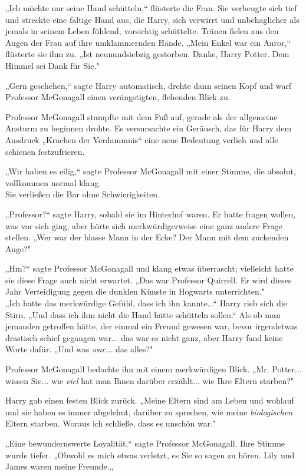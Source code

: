 {„Ich möchte nur seine Hand schütteln,“ flüsterte die Frau. Sie verbeugte sich tief und streckte eine faltige Hand aus, die Harry, sich verwirrt und unbehaglicher als jemals in seinem Leben fühlend, vorsichtig schüttelte. Tränen fielen aus den Augen der Frau auf ihre umklammernden Hände. „Mein Enkel war ein Auror,“ flüsterte sie ihm zu. „Ist neunundsiebzig gestorben. Danke, Harry Potter. Dem Himmel sei Dank für Sie."

„Gern geschehen,“ sagte Harry automatisch, drehte dann seinen Kopf und warf Professor McGonagall einen verängstigten, flehenden Blick zu.

Professor McGonagall stampfte mit dem Fuß auf, gerade als der allgemeine Ansturm zu beginnen drohte. Es versursachte ein Geräusch, das für Harry dem Ausdruck „Krachen der Verdammnis“ eine neue Bedeutung verlieh und alle schienen festzufrieren.

„Wir haben es eilig,“ sagte Professor McGonagall mit einer Stimme, die absolut, vollkommen normal klang.\\ Sie verließen die Bar ohne Schwierigkeiten.

„Professor?“ sagte Harry, sobald sie im Hinterhof waren. Er hatte fragen wollen, was vor sich ging, aber hörte sich merkwürdigerweise eine ganz andere Frage stellen. „Wer war der blasse Mann in der Ecke? Der Mann mit dem zuckenden Auge?"

„Hm?“ sagte Professor McGonagall und klang etwas überrascht; vielleicht hatte sie diese Frage auch nicht erwartet. „Das war Professor Quirrell. Er wird dieses Jahr Verteidigung gegen die dunklen Künste in Hogwarts unterrichten."\\ „Ich hatte das merkwürdige Gefühl, dass ich ihn kannte...“ Harry rieb sich die Stirn. „Und dass ich ihm nicht die Hand hätte schütteln sollen.“ Als ob man jemanden getroffen hätte, der einmal ein Freund gewesen war, bevor irgendetwas drastisch schief gegangen war... das war es nicht ganz, aber Harry fand keine Worte dafür. „Und was \emph{war...} das alles?"

Professor McGonagall bedachte ihn mit einem merkwürdigen Blick. „Mr. Potter... wissen Sie... wie \emph{viel} hat man Ihnen darüber erzählt... wie Ihre Eltern starben?"

Harry gab einen festen Blick zurück. „Meine Eltern sind am Leben und wohlauf und sie haben es immer abgelehnt, darüber zu sprechen, wie meine \emph{biologischen} Eltern starben. Woraus ich schließe, dass es unschön war."

„Eine bewundernswerte Loyalität,“ sagte Professor McGonagall. Ihre Stimme wurde tiefer. „Obwohl es mich etwas verletzt, es Sie so sagen zu hören. Lily und James waren meine Freunde.„

}
